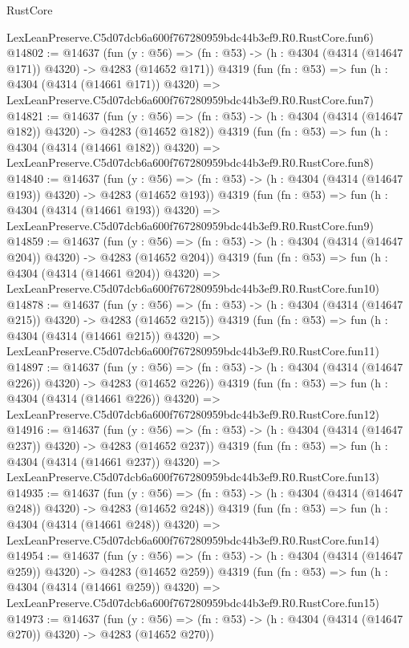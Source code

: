 \begin{lexlean}{RustCore}
\begin{coremodule}
    LexLeanPreserve.C5d07dcb6a600f767280959bdc44b3ef9.R0.RustCore.fun6)
@14802 := @14637
    (fun (y : @56) => (fn : @53) -> (h : @4304 (@4314 (@14647 @171)) @4320) -> @4283 (@14652 @171))
    @4319
    (fun (fn : @53) =>
    fun (h : @4304 (@4314 (@14661 @171)) @4320) =>
    LexLeanPreserve.C5d07dcb6a600f767280959bdc44b3ef9.R0.RustCore.fun7)
@14821 := @14637
    (fun (y : @56) => (fn : @53) -> (h : @4304 (@4314 (@14647 @182)) @4320) -> @4283 (@14652 @182))
    @4319
    (fun (fn : @53) =>
    fun (h : @4304 (@4314 (@14661 @182)) @4320) =>
    LexLeanPreserve.C5d07dcb6a600f767280959bdc44b3ef9.R0.RustCore.fun8)
@14840 := @14637
    (fun (y : @56) => (fn : @53) -> (h : @4304 (@4314 (@14647 @193)) @4320) -> @4283 (@14652 @193))
    @4319
    (fun (fn : @53) =>
    fun (h : @4304 (@4314 (@14661 @193)) @4320) =>
    LexLeanPreserve.C5d07dcb6a600f767280959bdc44b3ef9.R0.RustCore.fun9)
@14859 := @14637
    (fun (y : @56) => (fn : @53) -> (h : @4304 (@4314 (@14647 @204)) @4320) -> @4283 (@14652 @204))
    @4319
    (fun (fn : @53) =>
    fun (h : @4304 (@4314 (@14661 @204)) @4320) =>
    LexLeanPreserve.C5d07dcb6a600f767280959bdc44b3ef9.R0.RustCore.fun10)
@14878 := @14637
    (fun (y : @56) => (fn : @53) -> (h : @4304 (@4314 (@14647 @215)) @4320) -> @4283 (@14652 @215))
    @4319
    (fun (fn : @53) =>
    fun (h : @4304 (@4314 (@14661 @215)) @4320) =>
    LexLeanPreserve.C5d07dcb6a600f767280959bdc44b3ef9.R0.RustCore.fun11)
@14897 := @14637
    (fun (y : @56) => (fn : @53) -> (h : @4304 (@4314 (@14647 @226)) @4320) -> @4283 (@14652 @226))
    @4319
    (fun (fn : @53) =>
    fun (h : @4304 (@4314 (@14661 @226)) @4320) =>
    LexLeanPreserve.C5d07dcb6a600f767280959bdc44b3ef9.R0.RustCore.fun12)
@14916 := @14637
    (fun (y : @56) => (fn : @53) -> (h : @4304 (@4314 (@14647 @237)) @4320) -> @4283 (@14652 @237))
    @4319
    (fun (fn : @53) =>
    fun (h : @4304 (@4314 (@14661 @237)) @4320) =>
    LexLeanPreserve.C5d07dcb6a600f767280959bdc44b3ef9.R0.RustCore.fun13)
@14935 := @14637
    (fun (y : @56) => (fn : @53) -> (h : @4304 (@4314 (@14647 @248)) @4320) -> @4283 (@14652 @248))
    @4319
    (fun (fn : @53) =>
    fun (h : @4304 (@4314 (@14661 @248)) @4320) =>
    LexLeanPreserve.C5d07dcb6a600f767280959bdc44b3ef9.R0.RustCore.fun14)
@14954 := @14637
    (fun (y : @56) => (fn : @53) -> (h : @4304 (@4314 (@14647 @259)) @4320) -> @4283 (@14652 @259))
    @4319
    (fun (fn : @53) =>
    fun (h : @4304 (@4314 (@14661 @259)) @4320) =>
    LexLeanPreserve.C5d07dcb6a600f767280959bdc44b3ef9.R0.RustCore.fun15)
@14973 := @14637
    (fun (y : @56) => (fn : @53) -> (h : @4304 (@4314 (@14647 @270)) @4320) -> @4283 (@14652 @270))

\end{coremodule}
\end{lexlean}
